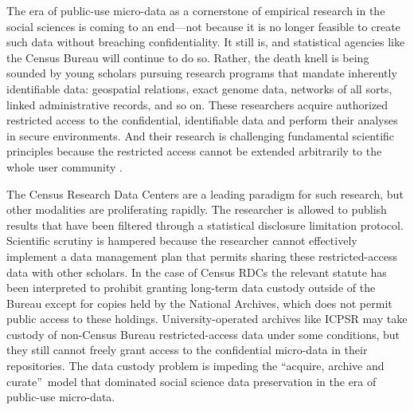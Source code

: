                       


The era of public-use micro-data as a cornerstone of empirical research in
the social sciences is coming to an end---not because it is no longer
feasible to create such data without breaching confidentiality. It still is,
and statistical agencies like the Census Bureau will continue to do so.
Rather, the death knell is being sounded by young scholars pursuing research
programs that mandate inherently identifiable data: geospatial relations,
exact genome data, networks of all sorts, linked administrative records, and
so on. These researchers acquire authorized restricted access to the
confidential, identifiable data and perform their analyses in secure
environments. And their research is challenging fundamental scientific
principles because the restricted access cannot be extended arbitrarily to
the whole user community \cite{Huberman2012}.

The Census Research Data Centers are a leading paradigm for such research,
but other modalities are proliferating rapidly. The researcher is allowed to
publish results that have been filtered through a statistical disclosure
limitation protocol. Scientific scrutiny is hampered because the researcher
cannot effectively implement a data management plan that permits sharing
these restricted-access data with other scholars. In the case of Census RDCs
the relevant statute has been interpreted to prohibit granting long-term
data custody outside of the Bureau except for copies held by the National
Archives, which does not permit public access to these holdings.
University-operated archives like ICPSR may take custody of non-Census
Bureau restricted-access data under some conditions, but they still cannot
freely grant access to the confidential micro-data in their repositories.
The data custody problem is impeding the \textquotedblleft acquire, archive
and curate\textquotedblright\ model that dominated social science data
preservation in the era of public-use micro-data.
